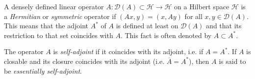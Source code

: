 \documentclass[12pt]{article}
\begin{document}
 
A densely defined linear operator $A\colon\mathscr{D}(A)\subset \mathscr{H}\to\mathscr{H}$ on a Hilbert space $\mathscr{H}$ is a \emph{Hermitian} or \emph{symmetric} operator if $(Ax,y) = (x,Ay)$ for all $x,y\in \mathscr{D}(A)$. This means that the adjoint $A^*$ of $A$ is defined at least on $\mathscr{D}(A)$ and that its restriction to that set coincides with $A$. This fact is often denoted by $A\subset A^*$.

The operator $A$ is \emph{self-adjoint} if it coincides with its adjoint, i.e. if $A=A^*$.
If $A$ is closable and its closure coincides with its adjoint (i.e. $\overline{A}=A^*$), then $A$ is said to be \emph{essentially self-adjoint}.
\end{document}
